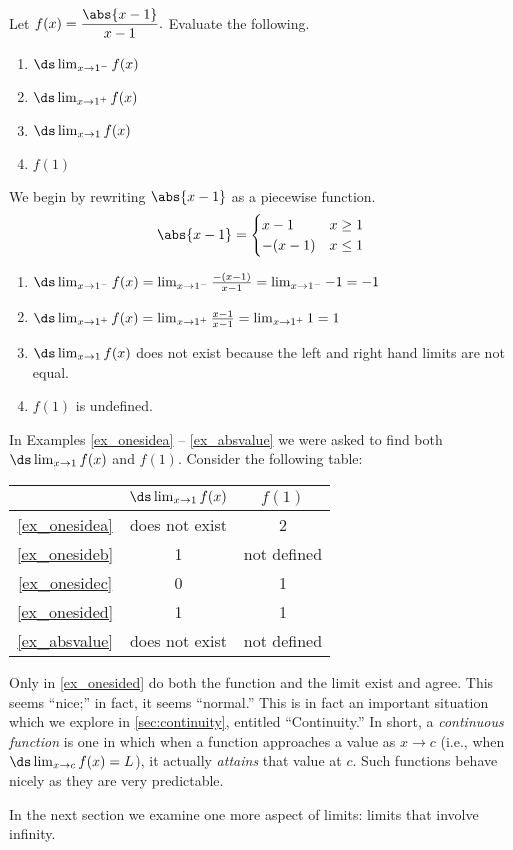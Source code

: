 \begin{example}\label{ex_absvalue}
Let $f(x) =\dfrac{\abs{x-1}}{x-1}.$ Evaluate the following.
\begin{multicols}{2}
	\begin{enumerate}
		\item	$\ds \lim_{x\to 1^-} f(x)$
		\item	$\ds \lim_{x\to 1^+} f(x)$
		\item	$\ds \lim_{x\to 1} f(x)$
		\item	$f(1)$
	\end{enumerate}
\end{multicols}
\solution
We begin by rewriting $\abs{x-1}$ as a piecewise function.
\[\abs{x-1}=\begin{cases}x-1 & x\geq 1 \\ -(x-1) & x\leq 1\end{cases}\]
\begin{enumerate}
\item	$\ds \lim_{x\to 1^-} f(x)=\lim_{x\to 1^-}\frac{-(x-1)}{x-1}=\lim_{x\to 1^-}-1=-1$
\item	$\ds \lim_{x\to 1^+} f(x)=\lim_{x\to 1^+}\frac{x-1}{x-1}=\lim_{x\to 1^+}1=1$
\item 	$\ds \lim_{x\to 1} f(x)$ does not exist because the left and right hand limits are not equal.
\item $f(1)$ is undefined.
\end{enumerate}
\end{example}

In Examples \ref{ex_onesidea} -- \ref{ex_absvalue} we were asked to find both $\ds \lim_{x\to 1}f(x)$ and $f(1)$. Consider the following table:
\begin{center}
\begin{tabular}{ c c c }
 & $\ds \lim_{x\to 1}f(x)$ & $f(1)$ \\ \midrule
\autoref{ex_onesidea} & does not exist & 2 \\
\autoref{ex_onesideb} & 1 & not defined \\
\autoref{ex_onesidec} & 0 & 1 \\
\autoref{ex_onesided} & 1 & 1 \\
\autoref{ex_absvalue} & does not exist & not defined
\end{tabular}
\end{center}

Only in \autoref{ex_onesided} do both the function and the limit exist and agree. This seems ``nice;'' in fact, it seems ``normal.'' This is in fact an important situation which we explore in \autoref{sec:continuity}, entitled ``Continuity.'' In short, a \emph{continuous function} is one in which when a function approaches a value as $x\rightarrow c$ (i.e., when $\ds \lim_{x\to c} f(x) = L$), it actually \emph{attains} that value at $c$. Such functions behave nicely as they are very predictable.

In the next section we examine one more aspect of limits: limits that involve infinity.

